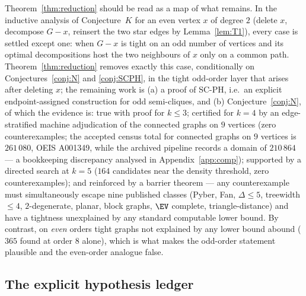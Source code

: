 \begin{remark}
Theorem~\ref{thm:reduction} should be read as a map of what remains. In the inductive analysis
of Conjecture~$K$ for an even vertex $x$ of degree $2$ (delete $x$, decompose $G-x$, reinsert
the two star edges by Lemma~\ref{lem:T1}), every case is settled except one: when $G-x$ is
tight on an odd number of vertices and its optimal decompositions host the two neighbours of
$x$ only on a common path. Theorem~\ref{thm:reduction} removes exactly this case, conditionally
on Conjectures~\ref{conj:N} and \ref{conj:SCPH}, in the tight odd-order layer that arises after
deleting $x$; the remaining work is (a) a proof of SC-PH, i.e.\ an explicit endpoint-assigned
construction for odd semi-cliques, and (b) Conjecture~\ref{conj:N}, of which the evidence is:
true with proof for $k\le3$; certified for $k=4$ by an edge-stratified machine adjudication
of the connected graphs on $9$ vertices (zero counterexamples; the accepted census total for
connected graphs on $9$ vertices is $261\,080$, OEIS A001349, while the archived pipeline
records a domain of $210\,864$ --- a bookkeeping discrepancy analysed in
Appendix~\ref{app:comp}); supported by a directed
search at $k=5$ ($164$ candidates near the density threshold, zero counterexamples); and
reinforced by a barrier theorem --- any counterexample must simultaneously escape nine
published classes (Pyber, Fan, $\Delta\le5$, treewidth $\le4$, $2$-degenerate, planar, block
graphs, $\EV$ complete, triangle-distance) and have a tightness unexplained by any standard
computable lower bound. By contrast, on \emph{even} orders tight graphs not explained by any
lower bound abound ($365$ found at order $8$ alone), which is what makes the odd-order
statement plausible and the even-order analogue false.
\end{remark}

\subsection{The explicit hypothesis ledger}\label{subsec:ledger}

